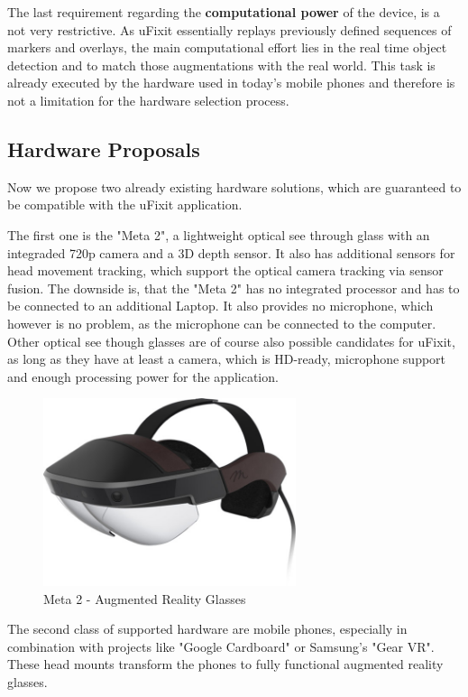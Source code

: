 The last requirement regarding the \textbf{computational power} of the device, is a not very restrictive. As uFixit essentially replays previously defined sequences of markers and overlays, the main computational effort lies in the real time object detection and to match those augmentations with the real world. This task is already executed by the hardware used in today’s mobile phones and therefore is not a limitation for the hardware selection process.

\subsection{Hardware Proposals}
Now we propose two already existing hardware solutions, which are guaranteed to be compatible with the uFixit application. 

The first one is the "Meta 2", a lightweight optical see through glass with an integraded 720p camera and a 3D depth sensor. It also has additional sensors for head movement tracking, which support the optical camera tracking via sensor fusion. The downside is, that the "Meta 2" has no integrated processor and has to be connected to an additional Laptop. It also provides no microphone, which however is no problem, as the microphone can be connected to the computer.
Other optical see though glasses are of course also possible candidates for uFixit, as long as they have at least a camera, which is HD-ready, microphone support and enough processing power for the application.
\begin{figure}[H]
		\includegraphics[width=0.66\textwidth]{../images/meta2.jpg}
		\centering
		\caption{Meta 2 - Augmented Reality Glasses}
		\label{fig:SWOT}
\end{figure}

The second class of supported hardware are mobile phones, especially in combination with projects like "Google Cardboard" or Samsung's "Gear VR". These head mounts transform the phones to fully functional augmented reality glasses. 

